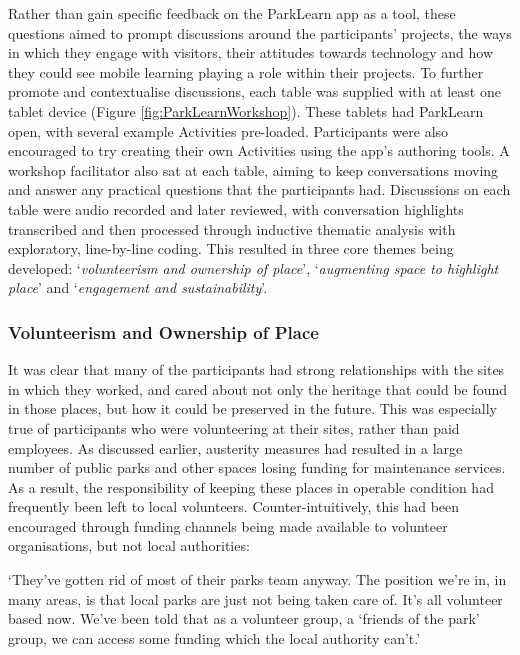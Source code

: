 Rather than gain specific feedback on the ParkLearn app as a tool, these questions aimed to prompt discussions around the participants' projects, the ways in which they engage with visitors, their attitudes towards technology and how they could see mobile learning playing a role within their projects. To further promote and contextualise discussions, each table was supplied with at least one tablet device (Figure \ref{fig:ParkLearnWorkshop}). These tablets had ParkLearn open, with several example Activities pre-loaded. Participants were also encouraged to try creating their own Activities using the app's authoring tools. A workshop facilitator also sat at each table, aiming to keep conversations moving and answer any practical questions that the participants had. Discussions on each table were audio recorded and later reviewed, with conversation highlights transcribed and then processed through inductive thematic analysis with exploratory, line-by-line coding. This resulted in three core themes being developed: `\textit{volunteerism and ownership of place}', `\textit{augmenting space to highlight place}' and `\textit{engagement and sustainability}'.

\subsubsection{Volunteerism and Ownership of Place}
It was clear that many of the participants had strong relationships with the sites in which they worked, and cared about not only the heritage that could be found in those places, but how it could be preserved in the future. This was especially true of participants who were volunteering at their sites, rather than paid employees. As discussed earlier, austerity measures had resulted in a large number of public parks and other spaces losing funding for maintenance services. As a result, the responsibility of keeping these places in operable condition had frequently been left to local volunteers. Counter-intuitively, this had been encouraged through funding channels being made available to volunteer organisations, but not local authorities: 

\begin{displayquote}
`They've gotten rid of most of their parks team anyway. The position we're in, in many areas, is that local parks are just not being taken care of. It's all volunteer based now. We've been told that as a volunteer group, a `friends of the park' group, we can access some funding which the local authority can't.'
\end{displayquote}

